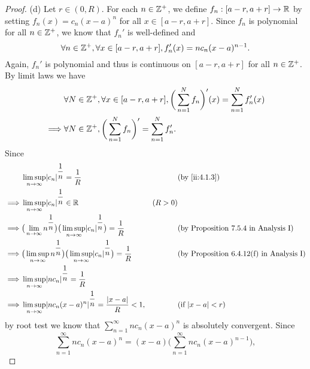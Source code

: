 \begin{proof}{(d)}
  Let \(r \in (0, R)\).
  For each \(n \in \mathbb{Z}^+\), we define \(f_n : [a - r, a + r] \to \mathbb{R}\) by setting \(f_n(x) = c_n (x - a)^n\) for all \(x \in [a - r, a + r]\).
  Since \(f_n\) is polynomial for all \(n \in \mathbb{Z}^+\), we know that \(f_n'\) is well-defined and
  \[
    \forall n \in \mathbb{Z}^+, \forall x \in [a - r, a + r], f_n'(x) = n c_n (x - a)^{n - 1}.
  \]
  Again, \(f_n'\) is polynomial and thus is continuous on \([a - r, a + r]\) for all \(n \in \mathbb{Z}^+\).
  By limit laws we have
  \begin{align*}
             & \forall N \in \mathbb{Z}^+, \forall x \in [a - r, a + r], \bigg(\sum_{n = 1}^N f_n\bigg)'(x) = \sum_{n = 1}^N f_n'(x) \\
    \implies & \forall N \in \mathbb{Z}^+, \bigg(\sum_{n = 1}^N f_n\bigg)' = \sum_{n = 1}^N f_n'.
  \end{align*}
  Since
  \begin{align*}
             & \limsup_{n \to \infty} \abs{c_n}^{\dfrac{1}{n}} = \dfrac{1}{R}                                                             &         & \by{ii:4.1.3}                                   \\
    \implies & \limsup_{n \to \infty} \abs{c_n}^{\dfrac{1}{n}} \in \R                                                                     & (R > 0)                                                   \\
    \implies & \big(\lim_{n \to \infty} n^{\dfrac{1}{n}}\big) \big(\limsup_{n \to \infty} \abs{c_n}^{\dfrac{1}{n}}\big) = \dfrac{1}{R}    &         & \text{(by Proposition 7.5.4 in Analysis I)}     \\
    \implies & \big(\limsup_{n \to \infty} n^{\dfrac{1}{n}}\big) \big(\limsup_{n \to \infty} \abs{c_n}^{\dfrac{1}{n}}\big) = \dfrac{1}{R} &         & \text{(by Proposition 6.4.12(f) in Analysis I)} \\
    \implies & \limsup_{n \to \infty} \abs{n c_n}^{\dfrac{1}{n}} = \dfrac{1}{R}                                                                                                                       \\
    \implies & \limsup_{n \to \infty} \abs{n c_n (x - a)^n}^{\dfrac{1}{n}} = \dfrac{\abs{x - a}}{R} < 1,                                  &         & \text{(if \(\abs{x - a} < r\))}
  \end{align*}
  by root test we know that \(\sum_{n = 1}^\infty n c_n (x - a)^n\) is absolutely convergent.
  Since
  \[
    \sum_{n = 1}^\infty n c_n (x - a)^n = (x - a) \bigg(\sum_{n = 1}^\infty n c_n (x - a)^{n - 1}\bigg),
\]
\end{proof}
